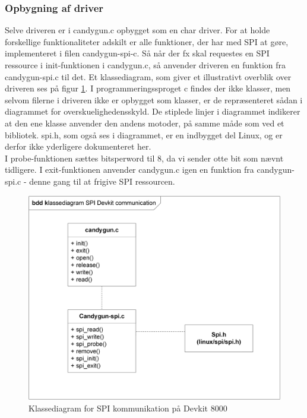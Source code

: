 \subsubsection{Opbygning af driver}
Selve driveren er i candygun.c opbygget som en char driver. For at holde forskellige funktionaliteter adskilt er alle funktioner, der har med SPI at gøre, implementeret i filen candygun-spi-c. Så når der fx skal requestes en SPI ressource i init-funktionen i candygun.c, så anvender driveren en funktion fra candygun-spi.c til det. Et klassediagram, som giver et illustrativt overblik over driveren ses på figur \ref{fig:spiklasse}. I programmeringssproget c findes der ikke klasser, men selvom filerne i driveren ikke er opbygget som klasser, er de repræsenteret sådan i diagrammet for overskuelighedensskyld. De stiplede linjer i diagrammet indikerer at den ene klasse anvender den andens motoder, på samme måde som ved et bibliotek. spi.h, som også ses i diagrammet, er en indbygget del Linux, og er derfor ikke yderligere dokumenteret her. \\
I probe-funktionen sættes bits\textunderscore per\textunderscore word til 8, da vi sender otte bit som nævnt tidligere. I exit-funktionen anvender candygun.c igen en funktion fra candygun-spi.c - denne gang til at frigive SPI ressourcen. 
 
 \begin{figure}[H]
 	\centering
 	\includegraphics[width=\textwidth]{Afsnit/DesignOgImplementering/images/SPIklasse}
 	\caption{Klassediagram for SPI kommunikation på Devkit 8000}
 	\label{fig:spiklasse}
 \end{figure}
 

